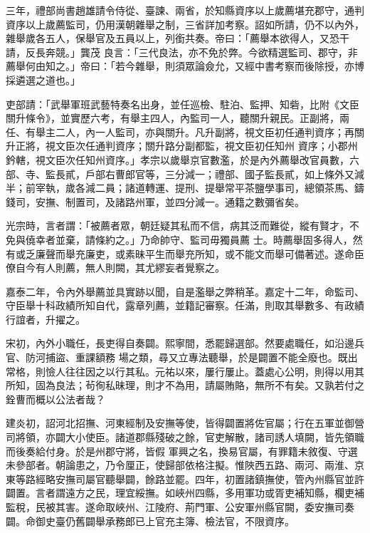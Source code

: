 \begin{pinyinscope}
 三年，禮部尚書趙雄請令侍從、臺諫、兩省，於知縣資序以上歲薦堪充郡守，通判資序以上歲薦監司，仍用漢朝雜舉之制，三省詳加考察。詔如所請，仍不以內外，雜舉歲各五人，保舉官及五員以上，列銜共奏。帝曰：「薦舉本欲得人，又恐干請，反長奔競。」龔茂
 良言：「三代良法，亦不免於弊。今欲精選監司、郡守，非薦舉何由知之。」帝曰：「若今雜舉，則須眾論僉允，又經中書考察而後除授，亦博採遴選之道也。」



 吏部請：「武舉軍班武藝特奏名出身，並任巡檢、駐泊、監押、知砦，比附《文臣關升條令》，並實歷六考，有舉主四人，內監司一人，聽關升親民。正副將，兩任、有舉主二人，內一人監司，亦與關升。凡升副將，視文臣初任通判資序；再關升正將，視文臣次任通判資序；關升路分副都監，視文臣初任知州
 資序；小郡州鈐轄，視文臣次任知州資序。」孝宗以歲舉京官數濫，於是內外薦舉改官員數，六部、寺、監長貳，戶部右曹郎官等，三分減一；禮部、國子監長貳，如上條外又減半；前宰執，歲各減二員；諸道轉運、提刑、提舉常平茶鹽學事司，總領茶馬、鑄錢司，安撫、制置司，及諸路州軍，並四分減一。通籍之數彌省矣。



 光宗時，言者謂：「被薦者眾，朝廷疑其私而不信，病其泛而難從，縱有賢才，不免與僥幸者並棄，請條約之。」乃命帥守、監司毋獨員薦
 士。時薦舉固多得人，然有或乏廉聲而舉充廉吏，或素昧平生而舉充所知，或不能文而舉可備著述。遂命臣僚自今有人則薦，無人則闕，其尤繆妄者覺察之。



 嘉泰二年，令內外舉薦並具實跡以聞，自是濫舉之弊稍革。嘉定十二年，命監司、守臣舉十科政績所知自代，露章列薦，並籍記審察。任滿，則取其舉數多、有政績行誼者，升擢之。



 宋初，內外小職任，長吏得自奏闢。熙寧間，悉罷歸選部。然要處職任，如沿邊兵官、防河捕盜、重課額務
 場之類，尋又立專法聽舉，於是闢置不能全廢也。既出常格，則憸人往往因之以行其私。元祐以來，屢行屢止。蓋處心公明，則得以用其所知，固為良法；茍徇私昧理，則才不為用，請屬賄賂，無所不有矣。又孰若付之銓曹而概以公法者哉？



 建炎初，詔河北招撫、河東經制及安撫等使，皆得闢置將佐官屬；行在五軍並御營司將領，亦闢大小使臣。諸道郡縣殘破之餘，官吏解散，諸司誘人填闕，皆先領職而後奏給付身。於是州郡守將，皆假
 軍興之名，換易官屬，有罪籍未敘復、守選未參部者。朝論患之，乃令厘正，使歸部依格注擬。惟陜西五路、兩河、兩淮、京東等路經略安撫司屬官聽舉闢，餘路並罷。四年，初置諸鎮撫使，管內州縣官並許闢置。言者謂遠方之民，理宜綏撫。如峽州四縣，多用軍功或胥吏補知縣，欄吏補監稅，民被其害。遂命取峽州、江陵府、荊門軍、公安軍州縣官闕，委安撫司奏闢。命御史臺仍舊闢舉承務郎已上官充主簿、檢法官，不限資序。




\end{pinyinscope}
